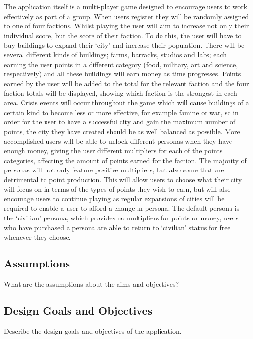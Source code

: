 \documentclass{sig-alt-release2}
\begin{document}
The application itself is a multi-player game designed to encourage users to work effectively as part of a group. When users register they will be randomly assigned to one of four factions. Whilst playing the user will aim to increase not only their individual score, but the score of their faction. To do this, the user will have to buy buildings to expand their `city' and increase their population. There will be several different kinds of buildings; farms, barracks, studios and labs; each earning the user points in a different category (food, military, art and science, respectively) and all these buildings will earn money as time progresses. Points earned by the user will be added to the total for the relevant faction and the four faction totals will be displayed, showing which faction is the strongest in each area. Crisis events will occur throughout the game which will cause buildings of a certain kind to become less or more effective, for example famine or war, so in order for the user to have a successful city and gain the maximum number of points, the city they have created should be as well balanced as possible. More accomplished users will be able to unlock different personas when they have enough money, giving the user different multipliers for each of the points categories, affecting the amount of points earned for the faction. The majority of personas will not only feature positive multipliers, but also some that are detrimental to point production. This will allow users to choose what their city will focus on in terms of the types of points they wish to earn, but will also encourage users to continue playing as regular expansions of cities will be required to enable a user to afford a change in persona. The default persona is the `civilian' persona, which provides no multipliers for points or money, users who have purchased a persona are able to return to `civilian' status for free whenever they choose.

\subsection{Assumptions}

What are the assumptions about the aims and objectives?\\

\subsection{Design Goals and Objectives} 

Describe the design goals and objectives of the application.\\
\end{document}
